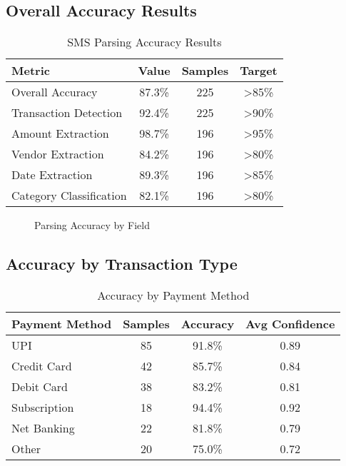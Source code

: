 \documentclass[11pt,a4paper]{report}
\begin{document}
\begin{itemize}
\begin{itemize}
\subsection{Overall Accuracy Results}

\begin{table}[H]
\centering
\caption{SMS Parsing Accuracy Results}
\begin{tabular}{|l|c|c|c|}
\hline
\textbf{Metric} & \textbf{Value} & \textbf{Samples} & \textbf{Target} \\
\hline
Overall Accuracy & 87.3\% & 225 & >85\% \\
Transaction Detection & 92.4\% & 225 & >90\% \\
Amount Extraction & 98.7\% & 196 & >95\% \\
Vendor Extraction & 84.2\% & 196 & >80\% \\
Date Extraction & 89.3\% & 196 & >85\% \\
Category Classification & 82.1\% & 196 & >80\% \\
\hline
\end{tabular}
\end{table}

\begin{figure}[H]
    \centering
    \caption{Parsing Accuracy by Field}
    \label{fig:accuracy_chart}
\end{figure}

\subsection{Accuracy by Transaction Type}

\begin{table}[H]
\centering
\caption{Accuracy by Payment Method}
\begin{tabular}{|l|c|c|c|}
\hline
\textbf{Payment Method} & \textbf{Samples} & \textbf{Accuracy} & \textbf{Avg Confidence} \\
\hline
UPI & 85 & 91.8\% & 0.89 \\
Credit Card & 42 & 85.7\% & 0.84 \\
Debit Card & 38 & 83.2\% & 0.81 \\
Subscription & 18 & 94.4\% & 0.92 \\
Net Banking & 22 & 81.8\% & 0.79 \\
Other & 20 & 75.0\% & 0.72 \\
\hline
\end{tabular}
\end{table}


\end{itemize}
\end{itemize}
\end{document}
